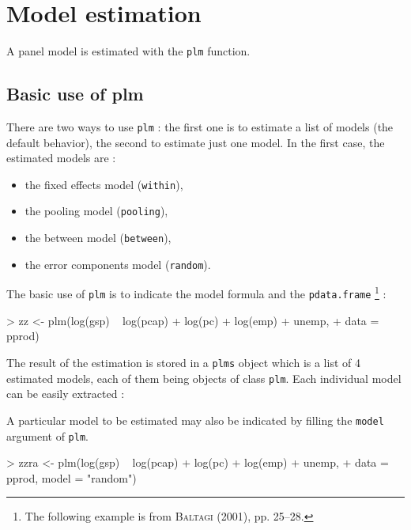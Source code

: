 \documentclass{article}
\begin{document}
\section{Model estimation}

A panel model is estimated with the \texttt{plm} function.

\subsection{Basic use of plm}

There are two ways to use \texttt{plm} : the first one is to estimate
a list of models (the default behavior), the second to estimate just one model.
In the first case, the estimated models are :

\begin{itemize}
\item the fixed effects model (\texttt{within}),
\item the pooling model (\texttt{pooling}),
\item the between model (\texttt{between}),
\item the error components model (\texttt{random}).
\end{itemize}

The basic use of \texttt{plm} is to indicate the model formula and the \texttt{pdata.frame}
\footnote{The following example is from \textsc{Baltagi} (2001), pp. 25--28.} :

\begin{Schunk}
\begin{Sinput}
> zz <- plm(log(gsp) ~ log(pcap) + log(pc) + log(emp) + unemp, 
+     data = pprod)
\end{Sinput}
\end{Schunk}

The result of the estimation is stored in a \texttt{plms} object which
is a list of 4 estimated models, each of them being objects of class \texttt{plm}.
Each individual model can be easily extracted :

\begin{Schunk}
\end{Schunk}

A particular model to be estimated may also be indicated by filling
the \texttt{model} argument of \texttt{plm}.

\begin{Schunk}
\begin{Sinput}
> zzra <- plm(log(gsp) ~ log(pcap) + log(pc) + log(emp) + unemp, 
+     data = pprod, model = "random")
\end{Sinput}
\end{Schunk}
\end{document}
